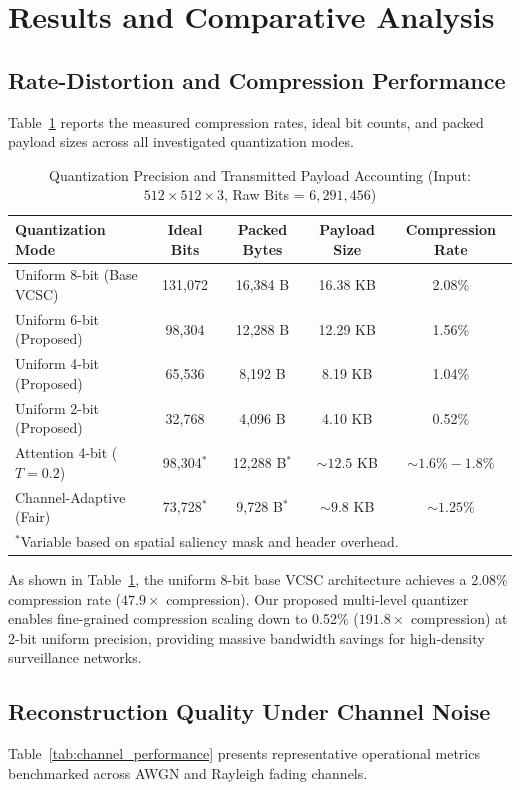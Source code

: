 \documentclass[journal,twocolumn]{IEEEtran}
\begin{document}
\section{Results and Comparative Analysis}
\subsection{Rate-Distortion and Compression Performance}
Table~\ref{tab:compression_performance} reports the measured compression rates, ideal bit counts, and packed payload sizes across all investigated quantization modes.

\begin{table}[h]
\centering
\caption{Quantization Precision and Transmitted Payload Accounting (Input: $512 \times 512 \times 3$, Raw Bits = $6,291,456$)}
\label{tab:compression_performance}
\small
\begin{tabular}{lcccc}
\toprule
\textbf{Quantization Mode} & \textbf{Ideal Bits} & \textbf{Packed Bytes} & \textbf{Payload Size} & \textbf{Compression Rate} \\
\midrule
Uniform 8-bit (Base VCSC) & 131,072 & 16,384 B & 16.38 KB & 2.08\% \\
Uniform 6-bit (Proposed) & 98,304 & 12,288 B & 12.29 KB & 1.56\% \\
Uniform 4-bit (Proposed) & 65,536 & 8,192 B & 8.19 KB & 1.04\% \\
Uniform 2-bit (Proposed) & 32,768 & 4,096 B & 4.10 KB & 0.52\% \\
Attention 4-bit ($T=0.2$) & 98,304$^*$ & 12,288 B$^*$ & $\sim 12.5$ KB & $\sim 1.6\% - 1.8\%$ \\
Channel-Adaptive (Fair) & 73,728$^*$ & 9,728 B$^*$ & $\sim 9.8$ KB & $\sim 1.25\%$ \\
\bottomrule
\multicolumn{5}{l}{\footnotesize $^*$Variable based on spatial saliency mask and header overhead.}
\end{tabular}
\end{table}

As shown in Table~\ref{tab:compression_performance}, the uniform 8-bit base VCSC architecture achieves a 2.08\% compression rate ($47.9\times$ compression). Our proposed multi-level quantizer enables fine-grained compression scaling down to 0.52\% ($191.8\times$ compression) at 2-bit uniform precision, providing massive bandwidth savings for high-density surveillance networks.

\subsection{Reconstruction Quality Under Channel Noise}
Table~\ref{tab:channel_performance} presents representative operational metrics benchmarked across AWGN and Rayleigh fading channels.
\end{document}
